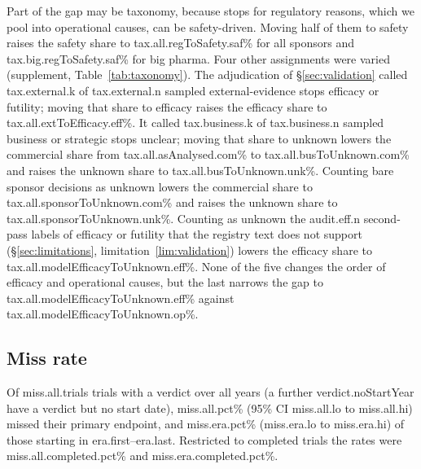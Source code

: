 \documentclass[11pt]{article}
\newcommand{\era}{\num{era.first}--\num{era.last}}
\begin{document}
Part of the gap may be taxonomy, because stops for regulatory reasons, which we pool into operational causes, can be safety-driven. Moving half of them to safety raises the safety share to \num{tax.all.regToSafety.saf}\% for all sponsors and \num{tax.big.regToSafety.saf}\% for big pharma. Four other assignments were varied (supplement, Table~\ref{tab:taxonomy}). The adjudication of \S\ref{sec:validation} called \num{tax.external.k} of \num{tax.external.n} sampled external-evidence stops efficacy or futility; moving that share to efficacy raises the efficacy share to \num{tax.all.extToEfficacy.eff}\%. It called \num{tax.business.k} of \num{tax.business.n} sampled business or strategic stops unclear; moving that share to unknown lowers the commercial share from \num{tax.all.asAnalysed.com}\% to \num{tax.all.busToUnknown.com}\% and raises the unknown share to \num{tax.all.busToUnknown.unk}\%. Counting bare sponsor decisions as unknown lowers the commercial share to \num{tax.all.sponsorToUnknown.com}\% and raises the unknown share to \num{tax.all.sponsorToUnknown.unk}\%. Counting as unknown the \num{audit.eff.n} second-pass labels of efficacy or futility that the registry text does not support (\S\ref{sec:limitations}, limitation~\ref{lim:validation}) lowers the efficacy share to \num{tax.all.modelEfficacyToUnknown.eff}\%. None of the five changes the order of efficacy and operational causes, but the last narrows the gap to \num{tax.all.modelEfficacyToUnknown.eff}\% against \num{tax.all.modelEfficacyToUnknown.op}\%.

\subsection{Miss rate}\label{sec:missrate}
Of \num{miss.all.trials} trials with a verdict over all years (a further \num{verdict.noStartYear} have a verdict but no start date), \num{miss.all.pct}\% (95\% CI \num{miss.all.lo} to \num{miss.all.hi}) missed their primary endpoint, and \num{miss.era.pct}\% (\num{miss.era.lo} to \num{miss.era.hi}) of those starting in \era. Restricted to completed trials the rates were \num{miss.all.completed.pct}\% and \num{miss.era.completed.pct}\%.
\end{document}
